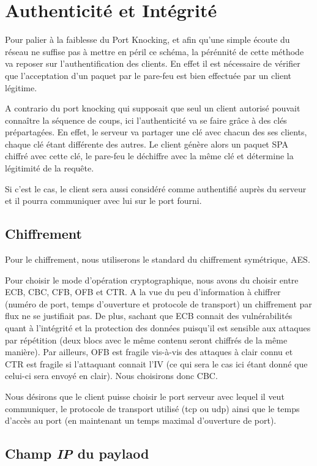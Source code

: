 \chapter{Authenticité et Intégrité}

Pour palier à la faiblesse du Port Knocking, et afin qu'une simple écoute du réseau ne suffise pas à mettre en péril ce schéma, la pérénnité de cette méthode va reposer sur l'authentification des clients. En effet il est nécessaire de vérifier que l'acceptation d'un paquet par le pare-feu est bien effectuée par un client légitime.

A contrario du port knocking qui supposait que seul un client autorisé pouvait connaître la séquence de coups, ici l'authenticité va se faire grâce à des clés prépartagées. En effet, le serveur va partager une clé avec chacun des ses clients, chaque clé étant différente des autres. 
Le client génère alors un paquet SPA chiffré avec cette clé, le pare-feu le déchiffre avec la même clé et détermine la légitimité de la requête.

Si c'est le cas, le client sera aussi considéré comme authentifié auprès du serveur et il pourra communiquer avec lui sur le port fourni.

\section{Chiffrement}
Pour le chiffrement, nous utiliserons le standard du chiffrement symétrique, AES. 

Pour choisir le mode d'opération cryptographique, nous avons du choisir entre ECB, CBC, CFB, OFB et CTR. 
A la vue du peu d'information à chiffrer (numéro de port, temps d'ouverture et protocole de transport) un chiffrement par flux ne se justifiait pas.
De plus, sachant que ECB connait des vulnérabilités quant à l'intégrité et la protection des données puisqu'il est sensible aux attaques par répétition (deux blocs avec le même contenu seront chiffrés de la même manière).
Par ailleurs, OFB est fragile vis-à-vis des attaques à clair connu et CTR est fragile si l'attaquant connait l'IV (ce qui sera le cas ici étant donné que celui-ci sera envoyé en clair).
Nous choisirons donc CBC.


Nous désirons que le client puisse choisir le port serveur avec lequel il veut communiquer, le protocole de transport utilisé (tcp ou udp) ainsi que le temps d'accès au port (en maintenant un temps maximal d'ouverture de port).

\section{Champ \textbf{\emph{IP}} du paylaod}

